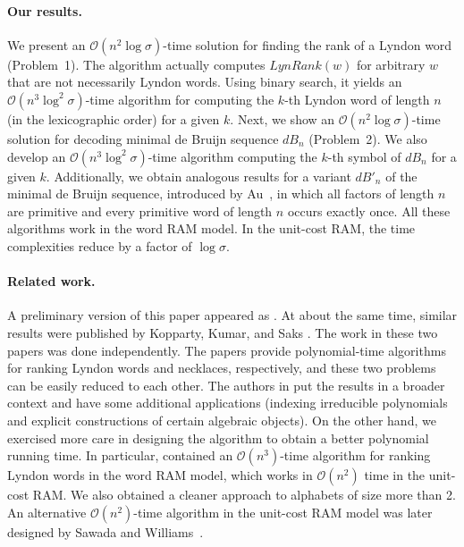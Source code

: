 \documentclass{article}
\newcommand{\Oh}{\mathcal{O}}
\newcommand{\dB}{dB}
\newcommand{\Lynd}{\mathit{LynRank}}
\theoremstyle{definition}
\theoremstyle{remark}
\begin{document}
\paragraph{\bf Our results.}
We present an $\Oh(n^2 \log \sigma)$-time solution for finding the rank of a Lyndon word
(Problem~1).
The algorithm actually computes $\Lynd(w)$ for arbitrary $w$ that are not necessarily Lyndon words.
Using binary search, it yields an $\Oh(n^3 \log^2 \sigma)$-time algorithm for computing
the $k$-th Lyndon word of length $n$ (in the lexicographic order) for a given $k$.
Next, we show an $\Oh(n^2\log \sigma)$-time solution for decoding minimal de Bruijn sequence $\dB_n$ (Problem~2).
We also develop an $\Oh(n^3 \log^2 \sigma)$-time algorithm computing the $k$-th symbol of
$\dB_n$ for a given $k$.
Additionally, we obtain analogous results for a variant $\dB'_n$ of the minimal de Bruijn sequence, introduced by Au~\cite{DBLP:journals/dm/Au15},
in which all factors of length $n$ are primitive and every primitive word of length $n$ occurs exactly once.
All these algorithms work in the word RAM model.
In the unit-cost RAM, the time complexities reduce by a factor of $\log \sigma$.

\paragraph{\bf Related work.}
A preliminary version of this paper
appeared as \cite{DBLP:conf/cpm/KociumakaRR14}.
At about the same time, similar results were published by Kopparty, Kumar, and Saks \cite{DBLP:conf/icalp/KoppartyKS14}.
The work in these two papers was done independently.
The papers provide polynomial-time algorithms for ranking Lyndon words and necklaces, respectively,
and these two problems can be easily reduced  to each other.
The authors in \cite{DBLP:conf/icalp/KoppartyKS14}
put the results in a broader context and have some additional applications
(indexing irreducible polynomials and explicit constructions of certain algebraic objects).
On the other hand, we exercised more care in designing the algorithm to obtain a better polynomial running time.
In particular, \cite{DBLP:conf/cpm/KociumakaRR14} contained an $\Oh(n^3)$-time
algorithm for ranking Lyndon words in the word RAM model,
which works in $\Oh(n^2)$ time in the unit-cost RAM.
We also obtained a cleaner approach to alphabets of size more than 2.
An alternative $\Oh(n^2)$-time algorithm in the unit-cost RAM model was later designed by Sawada and Williams~\cite{DBLP:journals/jda/SawadaW17}.
\end{document}
